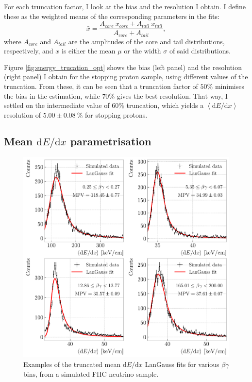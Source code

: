 For each truncation factor, I look at the bias and the resolution I obtain. I define these as the weighted means of the corresponding parameters in the fits:
\begin{equation}\label{eq:weighted_par_double_gauss}
	\bar{x} = \frac{A_{core}~x_{core}+A_{tail}~x_{tail}}{A_{core}+A_{tail}},
\end{equation}
where $A_{core}$ and $A_{tail}$ are the amplitudes of the core and tail distributions, respectively, and $x$ is either the mean $\mu$ or the width $\sigma$ of said distributions.

Figure \ref{fig:energy_trucation_opt} shows the bias (left panel) and the resolution (right panel) I obtain for the stopping proton sample, using different values of the truncation. From these, it can be seen that a truncation factor of $50\%$ minimises the bias in the estimation, while $70\%$ gives the best resolution. That way, I settled on the intermediate value of $60\%$ truncation, which yields a $\left<\mathrm{d}E/\mathrm{d}x\right>$ resolution of $5.00\pm0.08~\%$ for stopping protons.

\subsection[Mean \texorpdfstring{$\mathrm{d}E/\mathrm{d}x$}{dE/dx} parametrisation]{Mean \boldmath\texorpdfstring{$\mathrm{d}E/\mathrm{d}x$}{dE/dx} parametrisation} \label{subsec:dEdx_parametrisation}

\begin{figure}[t]
	\centering
	\includegraphics[width=.85\linewidth]{Images/GArSoft_PID/dEdx/dEdx_betagamma_examples.pdf}
	\caption[Examples of the truncated mean $\mathrm{d}E/\mathrm{d}x$ LanGauss fits for various $\beta\gamma$ bins, from a simulated FHC neutrino sample.]{Examples of the truncated mean $\mathrm{d}E/\mathrm{d}x$ LanGauss fits for various $\beta\gamma$ bins, from a simulated FHC neutrino sample.}
	\label{fig:dEdx_betagamma_fits}
\end{figure}

